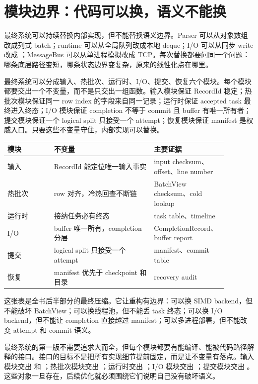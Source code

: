 \section{模块边界：代码可以换，语义不能换}

最终系统可以持续替换内部实现，但不能替换语义边界。Parser 可以从对象数组改成列式 batch；runtime 可以从全局队列改成本地 deque；I/O 可以从同步 write 改成 ；MessageBus 可以从单进程模拟改成 TCP。每次替换都要问同一个问题：哪条底层路径变短，哪条状态边界变复杂，原来的线性化点在哪里。

最终系统可以分成输入、热批次、运行时、I/O、提交、恢复六个模块。每个模块都要交出一个不变量，而不是只交出一组函数。输入模块保证 RecordId 稳定；热批次模块保证同一 row index 的字段来自同一记录；运行时保证 accepted task 最终进入终态；I/O 模块保证 completion 不等于 commit 且 buffer 有唯一所有者；提交模块保证一个 logical split 只接受一个 attempt；恢复模块保证 manifest 是权威入口。只要这些不变量守住，内部实现可以替换。

\begin{center}
\begin{tabular}{p{0.20\linewidth}p{0.43\linewidth}p{0.25\linewidth}}
\toprule
模块 & 不变量 & 主要证据 \\
\midrule
输入 & RecordId 能定位唯一输入事实 & input checksum、offset、line number \\
热批次 & row 对齐，冷热回查不断链 & BatchView checksum、cold lookup \\
运行时 & 接纳任务必有终态 & task table、timeline \\
I/O & buffer 唯一所有，completion 分层 & CompletionRecord、buffer report \\
提交 & logical split 只接受一个 attempt & manifest、commit table \\
恢复 & manifest 优先于 checkpoint 和目录 & recovery audit \\
\bottomrule
\end{tabular}
\end{center}

这张表是全书后半部分的最终压缩。它让重构有边界：可以换 SIMD backend，但不能破坏 BatchView；可以换线程池，但不能丢 task 终态；可以换 I/O backend，但不能让 completion 直接越过 manifest；可以多进程部署，但不能改变 attempt 和 commit 语义。

最终系统的第一版不需要追求大而全，但每个模块都要有能编译、能被代码路径解释的接口。接口的目标不是把所有实现细节提前固定，而是让不变量有落点。输入模块交出  和 ；热批次模块交出 ；运行时交出 ；I/O 模块交出 ；提交模块交出 。这些对象一旦存在，后续优化就必须围绕它们说明自己没有破坏语义。

